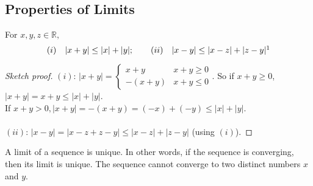 \documentclass[12pt]{article}
\begin{document}
\subsection{Properties of Limits}
\begin{lemma}\label{lemma:triangleneq}
  For $x,y,z \in \mathbb{R},$
  \[(i)\quad|x + y|  \leq |x| + |y|; \qquad (ii) \quad|x-y| \leq |x-z| + |z-y|\footnotemark\]
\end{lemma}



\begin{proof}[Sketch proof]
  $(i)$:
  $|x+y| = \begin{cases}
    x + y & x + y \geq 0\\
    -(x+y) & x + y \leq 0
  \end{cases}$.
  So if $x + y \geq 0$, $|x+y| = x + y \leq |x| + |y|$. \\
  If $x+y >0, |x+y| = -(x+y) = (-x) + (-y) \leq |x| + |y|$.\\\\
  $(ii)$: $|x-y| = |x-z + z - y| \leq |x-z| + |z-y|$ (using $(i)$).
\end{proof}




\begin{theorem}[$\textcolor{red}{\star}$]\label{thm:uniquelimitsequence}
  A limit of a sequence is unique. In other words, if the sequence is converging, then its limit is unique. The sequence cannot converge to two distinct numbers $x$ and $y$.\footnotemark
\end{theorem}
\end{document}
